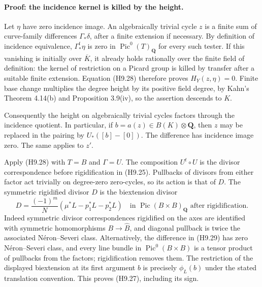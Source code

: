 \paragraph{Proof: the incidence kernel is killed by the height.}
Let $\eta$ have zero incidence image. An algebraically trivial cycle
$z$ is a finite sum of curve-family differences
$\Gamma_*\delta$, after a finite extension if necessary. By definition
of incidence equivalence, $\Gamma^t_*\eta$ is zero in
$\operatorname{Pic}^0(T)_{\mathbf Q}$ for every such tester. If this
vanishing is initially over $\overline K$, it already holds rationally
over the finite field of definition: the kernel of restriction on a
Picard group is killed by transfer after a suitable finite extension.
Equation (H9.28) therefore proves $H_Y(z,\eta)=0$. Finite base change
multiplies the degree height by its positive field degree, by Kahn's
Theorem 4.14(b) and Proposition 3.9(iv), so the assertion descends to
$K$.

Consequently the height on algebraically trivial cycles factors through
the incidence quotient. In particular, if $b=a(z)\in B(K)\otimes
\mathbf Q$, then $z$ may be replaced in the pairing by
$U_*([b]-[0])$. The difference has incidence image zero. The same
applies to $z'$.

Apply (H9.28) with $T=B$ and $\Gamma=U$. The composition $U^t\circ U$
is the divisor correspondence before rigidification in (H9.25).
Pullbacks of divisors from either factor act trivially on degree-zero
zero-cycles, so its action is that of $D$. The symmetric rigidified
divisor $D$ is the biextension divisor
\[
 D=\frac{(-1)^m}{N}
       (\mu^*L-p_1^*L-p_2^*L)
       \quad\text{in }\operatorname{Pic}(B\times B)_{\mathbf Q}
       \text{ after rigidification}.                        \tag{H9.29}
\]
Indeed symmetric divisor correspondences rigidified on the axes are
identified with symmetric homomorphisms $B\to\widehat B$, and
diagonal pullback is twice the associated N\'eron--Severi class.
Alternatively, the difference in (H9.29) has zero N\'eron--Severi class,
and every line bundle in $\operatorname{Pic}^0(B\times B)$ is a tensor
product of pullbacks from the factors; rigidification removes them.
The restriction of the displayed biextension at its first argument $b$
is precisely $\phi_L(b)$ under the stated translation convention.
This proves (H9.27), including its sign.

